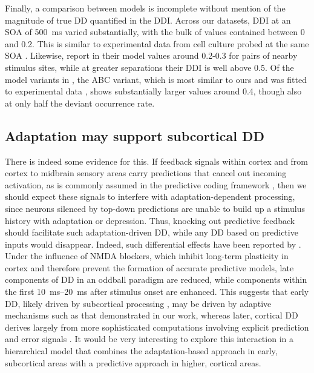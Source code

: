 \documentclass[10pt,letterpaper]{article}
\begin{document}
Finally, a comparison between models is incomplete without mention of the magnitude of true DD quantified in the DDI. Across our datasets, DDI at an SOA of \qty{500}{\milli\second} varied substantially, with the bulk of values contained between 0 and 0.2. This is similar to experimental data from cell culture probed at the same SOA \cite{Kubota2021-dx}. Likewise, \cite{Yarden2017-eh} report in their model values around 0.2-0.3 for pairs of nearby stimulus sites, while at greater separations their DDI is well above 0.5. Of the model variants in \cite{Mill2011-ah}, the ABC variant, which is most similar to ours and was fitted to experimental data \cite{Von_der_Behrens2009-cp}, shows substantially larger values around 0.4, though also at only half the deviant occurrence rate.

\subsection*{Adaptation may support subcortical DD}

There is indeed some evidence for this. If feedback signals within cortex and from cortex to midbrain sensory areas carry predictions that cancel out incoming activation, as is commonly assumed in the predictive coding framework \cite{Rao1999-xc, Friston2005-jz, Carbajal2018-sd}, then we should expect these signals to interfere with adaptation-dependent processing, since neurons silenced by top-down predictions are unable to build up a stimulus history with adaptation or depression. Thus, knocking out predictive feedback should facilitate such adaptation-driven DD, while any DD based on predictive inputs would disappear. Indeed, such differential effects have been reported by \cite{Harms2018-bg}. Under the influence of NMDA blockers, which inhibit long-term plasticity in cortex and therefore prevent the formation of accurate predictive models, late components of DD in an oddball paradigm are reduced, while components within the first \qtyrange{10}{20}{\milli\second} after stimulus onset are enhanced. This suggests that early DD, likely driven by subcortical processing \cite{Grimm2012-tb, Parras2017-fp}, may be driven by adaptive mechanisms such as that demonstrated in our work, whereas later, cortical DD derives largely from more sophisticated computations involving explicit prediction and error signals \cite{Schlossmacher2022-zv, Grimm2016-fr}. It would be very interesting to explore this interaction in a hierarchical model that combines the adaptation-based approach in early, subcortical areas with a predictive approach \cite{Wacongne2012-ah, Wacongne2016-ht, Hertag2020-kc} in higher, cortical areas. 
\end{document}
